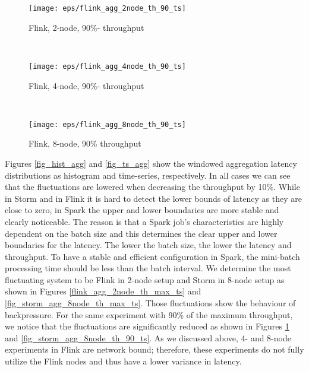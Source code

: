 \begin{figure*}
    \begin{subfigure}[b]{0.3\textwidth}
        \texttt{[image: eps/flink\_agg\_2node\_th\_90\_ts]}

        \caption{Flink, 2-node,  90\%- throughput }
        \label{fig_flink_agg_2node_th_90_ts}
    \end{subfigure}
    ~ 
    \begin{subfigure}[b]{0.3\textwidth}
        \texttt{[image: eps/flink\_agg\_4node\_th\_90\_ts]}

        \caption{Flink, 4-node,  90\%- throughput }
    \end{subfigure}
    ~ 
    \begin{subfigure}[b]{0.3\textwidth}
        \texttt{[image: eps/flink\_agg\_8node\_th\_90\_ts]}

        \caption{Flink, 8-node, 90\% throughput }
        
    \end{subfigure}

        \caption{Windowed aggregation latency distributions in time series}
                \label{fig_ts_agg}
\end{figure*}









Figures \ref{fig_hist_agg} and \ref{fig_ts_agg} show the windowed aggregation latency distributions as  histogram and  time-series,  respectively. 
In all cases we can see that the fluctuations are lowered when decreasing the throughput by 10\%.  While in Storm and in Flink it is hard to detect the lower bounds of latency as they are close to zero, in Spark the upper and lower boundaries are more stable and clearly noticeable. The reason is that a Spark job's characteristics are  highly dependent on the batch size and this determines the clear upper and lower boundaries for the latency. The lower the batch size, the lower the latency and throughput. To have a stable and efficient configuration in Spark, the mini-batch processing time should be less than the batch interval.  We determine the most fluctuating system to be Flink in  2-node setup and Storm in 8-node setup  as shown in Figures \ref{flink_agg_2node_th_max_ts} and \ref{fig_storm_agg_8node_th_max_ts}. Those fluctuations show the behaviour of backpressure. For the same experiment with 90\% of the maximum throughput, we notice that the fluctuations are significantly reduced as shown in  Figures \ref{fig_flink_agg_2node_th_90_ts} and \ref{fig_storm_agg_8node_th_90_ts}.
As we discussed above, 4- and 8-node experiments in Flink are network bound; therefore, these experiments do not fully utilize the Flink nodes and thus have a lower variance in latency. 



